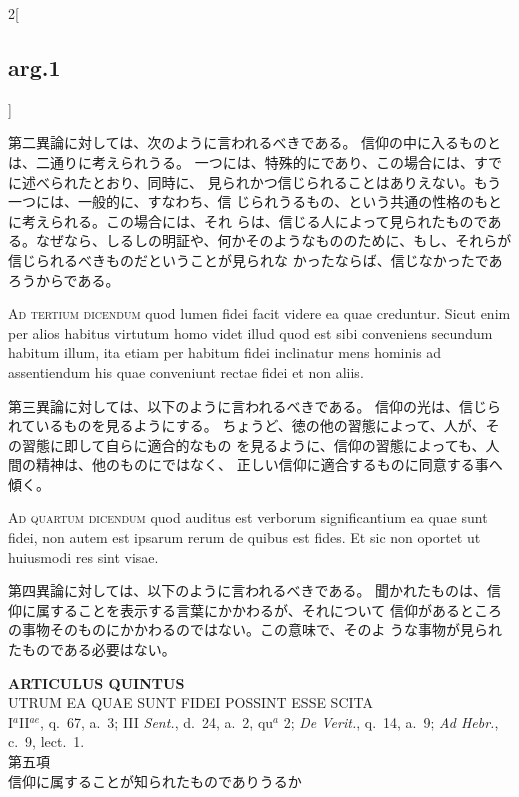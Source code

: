 \documentclass[paper=a4paper,fontsize=10pt,jafontsize=9pt,titlepage]{jlreq}
\begin{document}
\begin{paracol}{2}[\subsection{arg.1}]
\switchcolumn

第二異論に対しては、次のように言われるべきである。
信仰の中に入るものとは、二通りに考えられうる。
一つには、特殊的にであり、この場合には、すでに述べられたとおり、同時に、
 見られかつ信じられることはありえない。もう一つには、一般的に、すなわち、信
 じられうるもの、という共通の性格のもとに考えられる。この場合には、それ
 らは、信じる人によって見られたものである。なぜなら、しるしの明証や、何かそのようなもののために、もし、それらが信じられるべきものだということが見られな
 かったならば、信じなかったであろうからである。

\switchcolumn*[\subsection{ad.3}]

{\scshape Ad tertium dicendum} quod lumen fidei facit videre ea quae
creduntur. Sicut enim per alios habitus virtutum homo videt illud quod
est sibi conveniens secundum habitum illum, ita etiam per habitum fidei
inclinatur mens hominis ad assentiendum his quae conveniunt rectae fidei
et non aliis.

\switchcolumn

第三異論に対しては、以下のように言われるべきである。
信仰の光は、信じられているものを見るようにする。
ちょうど、徳の他の習態によって、人が、その習態に即して自らに適合的なもの
 を見るように、信仰の習態によっても、人間の精神は、他のものにではなく、
 正しい信仰に適合するものに同意する事へ傾く。

\switchcolumn*[\subsection{ad.4}]

{\scshape Ad quartum dicendum} quod auditus est verborum significantium
ea quae sunt fidei, non autem est ipsarum rerum de quibus est fides. Et
sic non oportet ut huiusmodi res sint visae.

\switchcolumn

第四異論に対しては、以下のように言われるべきである。
聞かれたものは、信仰に属することを表示する言葉にかかわるが、それについて
 信仰があるところの事物そのものにかかわるのではない。この意味で、そのよ
 うな事物が見られたものである必要はない。

\end{paracol}
\newpage

{}
\setcounter{section}{5}
\setcounter{subsection}{0}
\begin{center}
 {\Large {\bfseries ARTICULUS QUINTUS}}\\
 {\large UTRUM EA QUAE SUNT FIDEI POSSINT ESSE SCITA}\\
 {\footnotesize I$^a$II$^{ae}$, q.~67, a.~3; III {\itshape Sent.}, d.~24,
 a.~2, qu$^a$ 2; {\itshape De Verit.}, q.~14, a.~9; {\itshape Ad Hebr.},
 c.~9, lect.~1.}\\
 {\Large 第五項\\信仰に属することが知られたものでありうるか}
\end{center}
\end{document}
